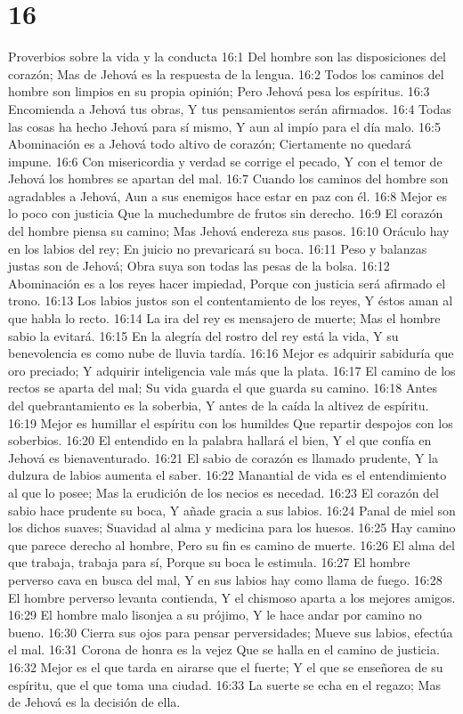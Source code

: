 \chapter{16}

Proverbios sobre la vida y la conducta  
16:1 Del hombre son las disposiciones del corazón;  
Mas de Jehová es la respuesta de la lengua.  
16:2 Todos los caminos del hombre son limpios en su propia opinión;  
Pero Jehová pesa los espíritus.  
16:3 Encomienda a Jehová tus obras,  
Y tus pensamientos serán afirmados.  
16:4 Todas las cosas ha hecho Jehová para sí mismo,  
Y aun al impío para el día malo.  
16:5 Abominación es a Jehová todo altivo de corazón;  
Ciertamente no quedará impune.  
16:6 Con misericordia y verdad se corrige el pecado,  
Y con el temor de Jehová los hombres se apartan del mal.  
16:7 Cuando los caminos del hombre son agradables a Jehová,  
Aun a sus enemigos hace estar en paz con él.  
16:8 Mejor es lo poco con justicia 
Que la muchedumbre de frutos sin derecho.  
16:9 El corazón del hombre piensa su camino;  
Mas Jehová endereza sus pasos.  
16:10 Oráculo hay en los labios del rey;  
En juicio no prevaricará su boca.  
16:11 Peso y balanzas justas son de Jehová;  
Obra suya son todas las pesas de la bolsa.  
16:12 Abominación es a los reyes hacer impiedad,  
Porque con justicia será afirmado el trono.  
16:13 Los labios justos son el contentamiento de los reyes,  
Y éstos aman al que habla lo recto.  
16:14 La ira del rey es mensajero de muerte;  
Mas el hombre sabio la evitará.  
16:15 En la alegría del rostro del rey está la vida,  
Y su benevolencia es como nube de lluvia tardía.  
16:16 Mejor es adquirir sabiduría que oro preciado;  
Y adquirir inteligencia vale más que la plata. 
16:17 El camino de los rectos se aparta del mal;  
Su vida guarda el que guarda su camino.  
16:18 Antes del quebrantamiento es la soberbia,  
Y antes de la caída la altivez de espíritu.  
16:19 Mejor es humillar el espíritu con los humildes  
Que repartir despojos con los soberbios.  
16:20 El entendido en la palabra hallará el bien,  
Y el que confía en Jehová es bienaventurado.  
16:21 El sabio de corazón es llamado prudente,  
Y la dulzura de labios aumenta el saber.  
16:22 Manantial de vida es el entendimiento al que lo posee;  
Mas la erudición de los necios es necedad.  
16:23 El corazón del sabio hace prudente su boca,  
Y añade gracia a sus labios.  
16:24 Panal de miel son los dichos suaves;  
Suavidad al alma y medicina para los huesos.  
16:25 Hay camino que parece derecho al hombre,  
Pero su fin es camino de muerte. 
16:26 El alma del que trabaja, trabaja para sí,  
Porque su boca le estimula.  
16:27 El hombre perverso cava en busca del mal,  
Y en sus labios hay como llama de fuego.  
16:28 El hombre perverso levanta contienda,  
Y el chismoso aparta a los mejores amigos.  
16:29 El hombre malo lisonjea a su prójimo,  
Y le hace andar por camino no bueno.  
16:30 Cierra sus ojos para pensar perversidades;  
Mueve sus labios, efectúa el mal.  
16:31 Corona de honra es la vejez  
Que se halla en el camino de justicia.  
16:32 Mejor es el que tarda en airarse que el fuerte;  
Y el que se enseñorea de su espíritu, que el que toma una ciudad.  
16:33 La suerte se echa en el regazo;  
Mas de Jehová es la decisión de ella.  
  

